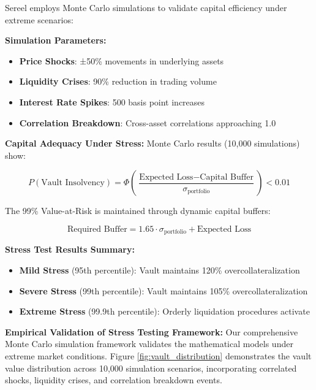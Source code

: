 \documentclass[12pt]{article}
\begin{document}
Sereel employs Monte Carlo simulations to validate capital efficiency under extreme scenarios:

\textbf{Simulation Parameters:}
\begin{itemize}
\item \textbf{Price Shocks}: ±50\% movements in underlying assets
\item \textbf{Liquidity Crises}: 90\% reduction in trading volume
\item \textbf{Interest Rate Spikes}: 500 basis point increases
\item \textbf{Correlation Breakdown}: Cross-asset correlations approaching 1.0
\end{itemize}

\textbf{Capital Adequacy Under Stress:}
Monte Carlo results (10,000 simulations) show:

\begin{equation}
P(\text{Vault Insolvency}) = \Phi\left(\frac{\text{Expected Loss} - \text{Capital Buffer}}{\sigma_{\text{portfolio}}}\right) < 0.01
\end{equation}

The 99\% Value-at-Risk is maintained through dynamic capital buffers:

\begin{equation}
\text{Required Buffer} = 1.65 \cdot \sigma_{\text{portfolio}} + \text{Expected Loss}
\end{equation}

\textbf{Stress Test Results Summary:}
\begin{itemize}
\item \textbf{Mild Stress} (95th percentile): Vault maintains 120\% overcollateralization
\item \textbf{Severe Stress} (99th percentile): Vault maintains 105\% overcollateralization  
\item \textbf{Extreme Stress} (99.9th percentile): Orderly liquidation procedures activate
\end{itemize}

\textbf{Empirical Validation of Stress Testing Framework:}
Our comprehensive Monte Carlo simulation framework validates the mathematical models under extreme market conditions. Figure \ref{fig:vault_distribution} demonstrates the vault value distribution across 10,000 simulation scenarios, incorporating correlated shocks, liquidity crises, and correlation breakdown events.
\end{document}
